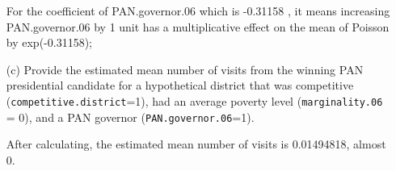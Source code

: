 \documentclass[12pt,letterpaper]{article}
\begin{document}
\begin{enumerate}
	For the coefficient of PAN.governor.06 which is -0.31158 , it means increasing PAN.governor.06 by 1 unit has a multiplicative effect on the mean of Poisson by exp(-0.31158);\\
	
	\item [(c)]
	Provide the estimated mean number of visits from the winning PAN presidential candidate for a hypothetical district that was competitive (\texttt{competitive.district}=1), had an average poverty level (\texttt{marginality.06} = 0), and a PAN governor (\texttt{PAN.governor.06}=1).
	
	\noindent  
	After calculating, the estimated mean number of visits is 0.01494818, almost 0.
\end{enumerate}
\end{document}
